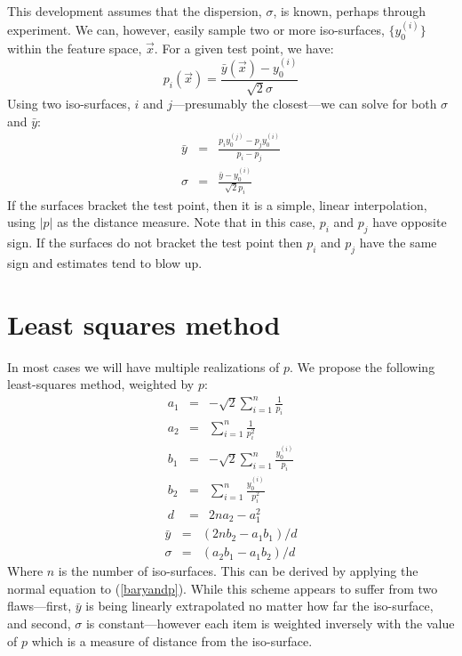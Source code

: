 \documentclass{article}
\begin{document}
This development assumes that the dispersion, $\sigma$, is known,
perhaps through experiment.
We can, however, easily sample two or more iso-surfaces, 
$\lbrace y_0^{(i)} \rbrace$
within the feature space, $\vec x$.  For a given test point, we have:
\begin{equation}
p_i(\vec x) = \frac{\bar y(\vec x) - y_0^{(i)}}{\sqrt 2 \sigma}
\label{baryandp}
\end{equation}
Using two iso-surfaces, 
$i$ and $j$---presumably the closest---we can solve for both
$\sigma$ and $\bar y$:
\begin{eqnarray}
\bar y & = & \frac{p_i y_0^{(j)} - p_j y_0^{(i)}}{p_i - p_j} \\
\sigma & = & \frac{\bar y - y_0^{(i)}}{\sqrt 2 p_i}
\end{eqnarray}
If the surfaces bracket the test point, then it is a simple, linear
interpolation, using $|p|$ as the distance measure. 
Note that in this case, $p_i$ and $p_j$ have opposite sign.
If the surfaces do not
bracket the test point
then $p_i$ and $p_j$ have the same sign and estimates tend to
blow up.

\section{Least squares method}

In most cases we will have multiple realizations of $p$.  We propose the
following least-squares method, weighted by $p$:
\begin{eqnarray}
a_1 & = & - \sqrt 2 \sum_{i=1}^n \frac{1}{p_i} \\
a_2 & = & \sum_{i=1}^n \frac{1}{p_i^2} \\
b_1 & = & - \sqrt 2 \sum_{i=1}^n \frac{y_0^{(i)}}{p_i} \\
b_2 & = & \sum_{i=1}^n \frac{y_0^{(i)}}{p_i^2} \\
d & = & 2 n a_2 - a_1^2 
\end{eqnarray}
\begin{eqnarray}
\bar y & = & (2 n b_2 - a_1 b_1)/d \\
\sigma & = & (a_2 b_1 - a_1 b_2)/d
\end{eqnarray}
Where $n$ is the number of iso-surfaces.  This can be derived by applying the normal equation to (\ref{baryandp}).
While this scheme appears to suffer from two flaws---first, $\bar y$ is being
linearly extrapolated no matter how far the iso-surface, and second,
$\sigma$ is constant---however each item is weighted inversely with the 
value of $p$ which is a measure of distance from the iso-surface.


\end{document}
